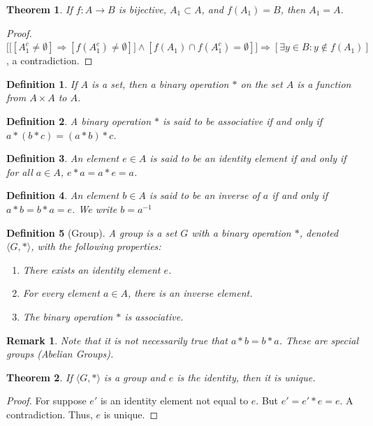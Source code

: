 \documentclass[oneside]{book}
\theoremstyle{mystyle}
\newtheorem{theorem}{Theorem}[section]
\newtheorem{definition}{Definition}[section]
\newtheorem{remark}{Remark}[section]
\begin{document}
\begin{theorem}
If $f:A\rightarrow B$ is bijective, $A_1\subset A$, and $f(A_1) = B$, then $A_1=A$.
\end{theorem}
\begin{proof}
$\Big[\big[[A_1^c \ne \emptyset]\Rightarrow [f(A_1^c) \ne \emptyset]\big]\land[f(A_1)\cap f(A_1^c) = \emptyset]\Big]\Rightarrow [\exists y\in B:y\notin f(A_1)]$, a contradiction.
\end{proof}

\begin{definition}
If $A$ is a set, then a binary operation $*$ on the set $A$ is a function from $A\times A$ to $A$.
\end{definition}

\begin{definition}
A binary operation $*$ is said to be associative if and only if $a*(b*c) = (a*b)*c$.
\end{definition}

\begin{definition}
An element $e\in A$ is said to be an identity element if and only if for all $a\in A$, $e*a = a*e = a$.
\end{definition}

\begin{definition}
An element $b\in A$ is said to be an inverse of $a$ if and only if $a*b=b*a = e$. We write $b=a^{-1}$
\end{definition}

\begin{definition}[Group]
A group is a set $G$ with a binary operation $*$, denoted $\langle G,* \rangle$, with the following properties: 
\begin{enumerate}
\item There exists an identity element $e$.
\item For every element $a\in A$, there is an inverse element.
\item The binary operation $*$ is associative.
\end{enumerate}
\end{definition}

\begin{remark}
Note that it is not necessarily true that $a*b = b*a$. These are special groups (Abelian Groups).
\end{remark}

\begin{theorem}
If $\langle G, * \rangle$ is a group and $e$ is the identity, then it is unique.
\end{theorem}
\begin{proof}
For suppose $e'$ is an identity element not equal to $e$. But $e' = e'*e  = e$. A contradiction. Thus, $e$ is unique.
\end{proof}
\end{document}
